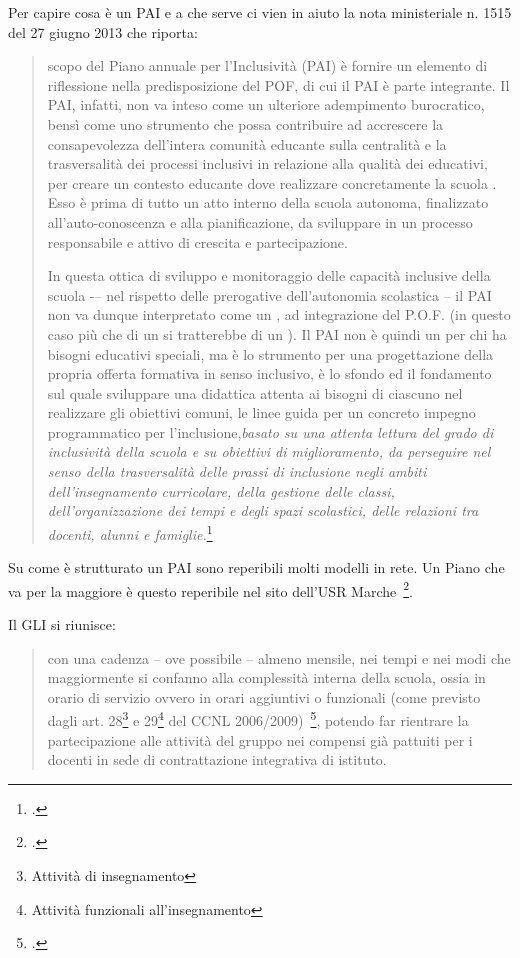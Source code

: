 Per capire cosa è un PAI e a che serve ci vien in aiuto la nota ministeriale n. 1515 del 27 giugno 2013 che riporta:
\begin{quote}
\mancatesto	scopo del Piano annuale per
	l'Inclusività (PAI) è fornire un elemento di riflessione nella predisposizione del POF, di cui il
	PAI è parte integrante. Il PAI, infatti, non va inteso come un ulteriore adempimento
	burocratico, bensì come uno strumento che possa contribuire ad accrescere la consapevolezza
	dell'intera comunità educante sulla centralità e la trasversalità dei processi inclusivi in relazione
	alla qualità dei  educativi, per creare un contesto educante dove realizzare concretamente
	la scuola . Esso è prima di tutto un atto interno della scuola autonoma,
	finalizzato all'auto-conoscenza e alla pianificazione, da sviluppare in un processo responsabile e
	attivo di crescita e partecipazione.
	
	In questa ottica di sviluppo e monitoraggio delle capacità inclusive della scuola -– nel rispetto
	delle prerogative dell'autonomia scolastica -- il PAI non va dunque interpretato come un , ad integrazione del P.O.F. (in questo caso
	più che di un  si tratterebbe di un ). Il PAI non è
	quindi un  per chi ha bisogni educativi speciali, ma è lo strumento per una
	progettazione della propria offerta formativa in senso inclusivo, è lo sfondo ed il fondamento sul
	quale sviluppare una didattica attenta ai bisogni di ciascuno nel realizzare gli obiettivi comuni, le
	linee guida per un concreto impegno programmatico per l'inclusione,\textit{basato su una attenta lettura del grado di inclusività della scuola e su obiettivi di miglioramento, da perseguire nel senso
	della trasversalità delle prassi di inclusione negli ambiti dell'insegnamento curricolare, della
	gestione delle classi, dell'organizzazione dei tempi e degli spazi scolastici, delle relazioni tra
	docenti, alunni e famiglie.}\footcite{Nota_1551_2013}
	
\end{quote}
Su come è strutturato un PAI sono reperibili molti modelli in rete. Un Piano che va per la maggiore è questo reperibile nel sito dell'USR Marche~\footcite{pai13b}.

Il GLI si riunisce:
\begin{quote}
	con una cadenza -- ove possibile -- almeno mensile, nei tempi e nei modi che maggiormente si confanno alla complessità interna della scuola, ossia in orario di servizio ovvero in orari aggiuntivi o funzionali (come previsto dagli art. 28\footnote{Attività di insegnamento} e 29\footnote{Attività funzionali all'insegnamento} del CCNL 2006/2009)~\footcite{ccnl_2006_09}, potendo far rientrare la partecipazione alle attività del gruppo nei compensi già pattuiti per i docenti in sede di contrattazione integrativa di istituto.
\end{quote}
